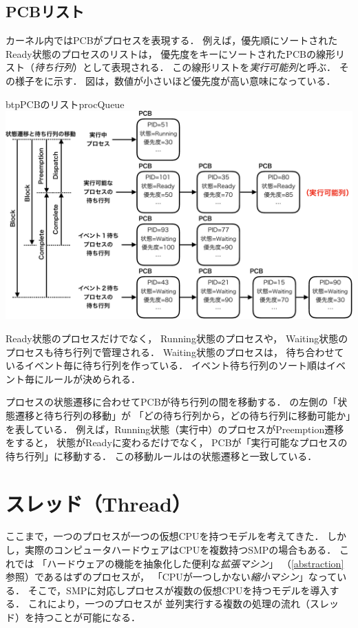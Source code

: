 \subsection{PCBリスト}
カーネル内ではPCBがプロセスを表現する．
例えば，優先順にソートされたReady状態のプロセスのリストは，
優先度をキーにソートされたPCBの線形リスト（\emph{待ち行列}）として表現される．
この線形リストを\emph{実行可能列}と呼ぶ．
その様子をに示す．
図は，数値が小さいほど優先度が高い意味になっている．

\begin{myfig}{btp}{PCBのリスト}{procQueue}
  \includegraphics[scale=0.55]{Fig/procQueue-crop.pdf}
\end{myfig}

Ready状態のプロセスだけでなく，
Running状態のプロセスや，
Waiting状態のプロセスも待ち行列で管理される．
Waiting状態のプロセスは，
待ち合わせているイベント毎に待ち行列を作っている．
イベント待ち行列のソート順はイベント毎にルールが決められる．

プロセスの状態遷移に合わせてPCBが待ち行列の間を移動する．
の左側の「状態遷移と待ち行列の移動」が
「どの待ち行列から，どの待ち行列に移動可能か」を表している．
例えば，Running状態（実行中）のプロセスがPreemption遷移をすると，
状態がReadyに変わるだけでなく，
PCBが「実行可能なプロセスの待ち行列」に移動する．
この移動ルールはの状態遷移と一致している．

\section{スレッド（Thread）}
ここまで，一つのプロセスが一つの仮想CPUを持つモデルを考えてきた．
しかし，実際のコンピュータハードウェアはCPUを複数持つSMPの場合もある．
これでは
「ハードウェアの機能を抽象化した便利な\emph{拡張マシン}」
（\ref{abstraction}参照）であるはずのプロセスが，
「CPUが一つしかない\emph{縮小マシン}」なっている．
そこで，SMPに対応しプロセスが複数の仮想CPUを持つモデルを導入する．
これにより，一つのプロセスが
並列実行する複数の処理の流れ（スレッド）を持つことが可能になる．

